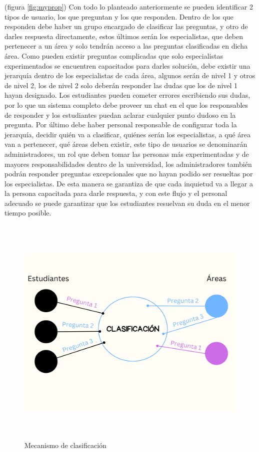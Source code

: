 (figura \ref{fig:myprop}) Con todo lo planteado anteriormente se pueden identificar 2 tipos de usuario, los que preguntan y los que responden. Dentro de los que responden debe haber un grupo encargado de clasificar las preguntas, y otro de darles respuesta directamente, estos últimos serán los especialistas, que deben pertenecer a un área y solo tendrán acceso a las preguntas clasificadas en dicha área. Como pueden existir preguntas complicadas que solo especialistas experimentados se encuentren capacitados para darles solución, debe existir una jerarquía dentro de los especialistas de cada área, algunos serán de nivel 1 y otros de nivel 2, los de nivel 2 solo deberán responder las dudas que los de nivel 1 hayan designado. Los estudiantes pueden cometer errores escribiendo sus dudas, por lo que un sistema completo debe proveer un chat en el que los responsables de responder y los estudiantes puedan aclarar cualquier punto dudoso en la pregunta. Por último debe haber personal responsable de configurar toda la jerarquía, decidir quién va a clasificar, quiénes serán los especialistas, a qué área van a pertenecer, qué áreas deben existir, este tipo de usuarios se denominarán administradores, un rol que deben tomar las personas más experimentadas y de mayores responsabilidades dentro de la universidad, los administradores también podrán responder preguntas excepcionales que no hayan podido ser resueltas por los especialistas. De esta manera se garantiza de que cada inquietud va a llegar a la persona capacitada para darle respuesta, y con este flujo y el personal adecuado se puede garantizar que los estudiantes resuelvan su duda en el menor tiempo posible.
\newline

\begin{figure}[h]
	\includegraphics[width=15cm, height=11.25cm]{clasification.png}
	\caption{Mecanismo de clasificación}
	\label{fig:clasification}
\end{figure}

